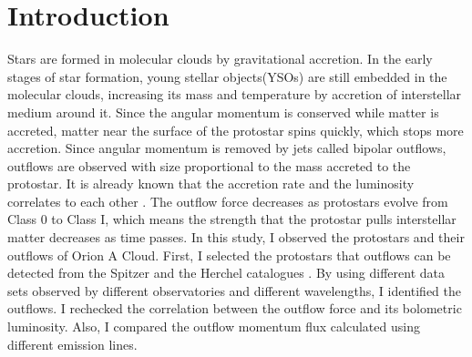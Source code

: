 
\section{Introduction}

Stars are formed in molecular clouds by gravitational accretion. In the early stages of star formation, young stellar objects(YSOs) are still embedded in the molecular clouds, increasing its mass and temperature by accretion of interstellar medium around it. Since the angular momentum is conserved while matter is accreted, matter near the surface of the protostar spins quickly, which stops more accretion. Since angular momentum is removed by jets called bipolar outflows, outflows are observed with size proportional to the mass accreted to the protostar\cite{bontemps1996evolution}. 
It is already known that the accretion rate and the luminosity correlates to each other \cite{kang2013outflow}. The outflow force decreases as protostars evolve from Class 0 to Class I, which means the strength that the protostar pulls interstellar matter decreases as time passes. 
In this study, I observed the protostars and their outflows of Orion A Cloud. First, I selected the protostars that outflows can be detected from the Spitzer and the Herchel catalogues \cite{megeath2012spitzer, furlan2016herschel}. By using different data sets observed by different observatories and different wavelengths, I identified the outflows. I rechecked the correlation between the outflow force and its bolometric luminosity. Also, I compared the outflow momentum flux calculated using different emission lines. \\
